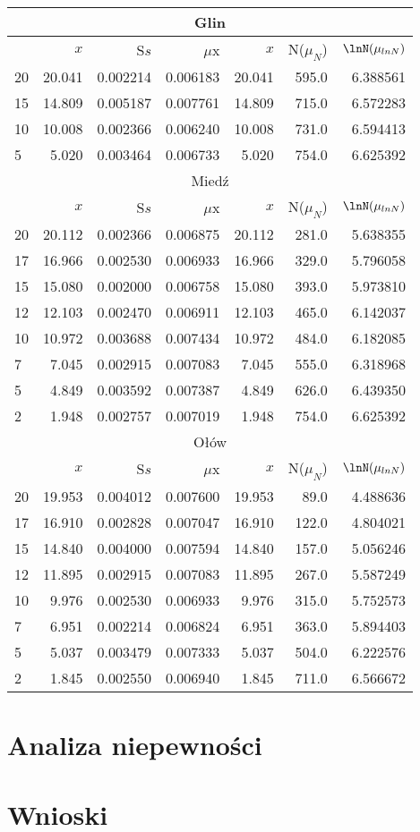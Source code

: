 \documentclass[a4paper,10pt]{article}
\begin{document}
\begin{tabular}{|l|r|r|r|r|r|r|}
\hline
\multicolumn{7}{|c|}{Glin} \\\hline
{} &     $x$ &      S$s$ &   $\mu$x &     $x$ &N($\mu_N$) &$\lnN(\mu_{lnN})$ \\\hline
20 &  20.041 &  0.002214 &  0.006183 &  20.041 &  595.0 &  6.388561 \\\hline
15 &  14.809 &  0.005187 &  0.007761 &  14.809 &  715.0 &  6.572283 \\\hline
10 &  10.008 &  0.002366 &  0.006240 &  10.008 &  731.0 &  6.594413 \\\hline
5  &   5.020 &  0.003464 &  0.006733 &   5.020 &  754.0 &  6.625392 \\\hline
\multicolumn{7}{|c|}{Miedź}                                         \\\hline
{} &     $x$ &      S$s$ &   $\mu$x &     $x$ &N($\mu_N$) &$\lnN(\mu_{lnN})$ \\\hline
20 &  20.112 &  0.002366 &  0.006875 &  20.112 &  281.0 &  5.638355 \\\hline
17 &  16.966 &  0.002530 &  0.006933 &  16.966 &  329.0 &  5.796058 \\\hline
15 &  15.080 &  0.002000 &  0.006758 &  15.080 &  393.0 &  5.973810 \\\hline
12 &  12.103 &  0.002470 &  0.006911 &  12.103 &  465.0 &  6.142037 \\\hline
10 &  10.972 &  0.003688 &  0.007434 &  10.972 &  484.0 &  6.182085 \\\hline
7 &   7.045 &  0.002915 &  0.007083 &   7.045 &  555.0 &  6.318968 \\\hline
5 &   4.849 &  0.003592 &  0.007387 &   4.849 &  626.0 &  6.439350 \\\hline
2 &   1.948 &  0.002757 &  0.007019 &   1.948 &  754.0 &  6.625392 \\\hline
\multicolumn{7}{|c|}{Ołów}                                          \\\hline
{} &     $x$ &      S$s$ &   $\mu$x &     $x$ &N($\mu_N$) &$\lnN(\mu_{lnN})$ \\\hline
20 &  19.953 &  0.004012 &  0.007600 &  19.953 &   89.0 &  4.488636 \\\hline
17 &  16.910 &  0.002828 &  0.007047 &  16.910 &  122.0 &  4.804021 \\\hline
15 &  14.840 &  0.004000 &  0.007594 &  14.840 &  157.0 &  5.056246 \\\hline
12 &  11.895 &  0.002915 &  0.007083 &  11.895 &  267.0 &  5.587249 \\\hline
10 &   9.976 &  0.002530 &  0.006933 &   9.976 &  315.0 &  5.752573 \\\hline
7 &   6.951 &  0.002214 &  0.006824 &   6.951 &  363.0 &  5.894403 \\\hline
5 &   5.037 &  0.003479 &  0.007333 &   5.037 &  504.0 &  6.222576 \\\hline
2 &   1.845 &  0.002550 &  0.006940 &   1.845 &  711.0 &  6.566672 \\\hline
\end{tabular}


\section{Analiza niepewności}

 \section{Wnioski}
\end{document}
